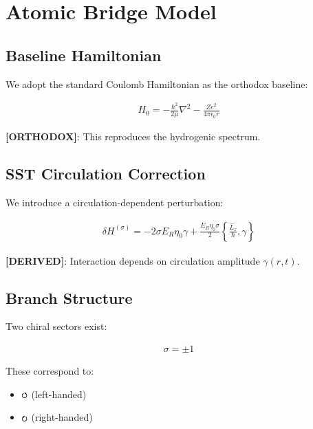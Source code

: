 \section{Atomic Bridge Model}
    \label{sec:atomic}
    
    \subsection{Baseline Hamiltonian}
        
        We adopt the standard Coulomb Hamiltonian as the orthodox baseline:
        
        \begin{align}
            H_0 = -\frac{\hbar^2}{2\mu} \nabla^2 - \frac{Ze^2}{4\pi \epsilon_0 r}
            \label{eq:coulomb}
        \end{align}
        
        \textbf{[ORTHODOX]}: This reproduces the hydrogenic spectrum.
    
    \subsection{SST Circulation Correction}
        
        We introduce a circulation-dependent perturbation:
        
        \begin{align}
            \delta H^{(\sigma)} = -2\sigma E_R \eta_0 \gamma + \frac{E_R \eta_0 \sigma}{2} \left\{ \frac{\hat{L}_z}{\hbar}, \gamma \right\}
            \label{eq:sst_correction}
        \end{align}
        
        \textbf{[DERIVED]}: Interaction depends on circulation amplitude $\gamma(r,t)$.
    
    \subsection{Branch Structure}
        
        Two chiral sectors exist:
        
        \begin{align}
            \sigma = \pm 1
        \end{align}
        
        These correspond to:
        
        \begin{itemize}
            \item $\swirlarrow$ (left-handed)
            \item $\swirlarrowcw$ (right-handed)
        \end{itemize}
    
